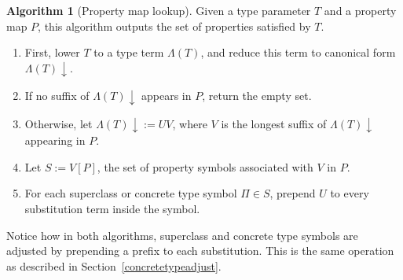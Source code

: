 \documentclass[headsepline,bibliography=totoc]{scrreport}
\theoremstyle{definition}
\theoremstyle{definition}
\theoremstyle{definition}
\newtheorem{algorithm}{Algorithm}[chapter]
\begin{document}
\begin{algorithm}[Property map lookup]\label{propmaplookupalgo} Given a type parameter $T$ and a property map $P$, this
algorithm outputs the set of properties satisfied by $T$.

\begin{enumerate}
\item First, lower $T$ to a type term $\Lambda(T)$, and reduce this term to canonical form $\Lambda(T){\downarrow}$.
\item If no suffix of $\Lambda(T){\downarrow}$ appears in $P$, return the empty set.
\item Otherwise, let $\Lambda(T){\downarrow}:=UV$, where $V$ is the longest suffix of $\Lambda(T){\downarrow}$ appearing in $P$.
\item Let $S:=V[P]$, the set of property symbols associated with $V$ in $P$.
\item For each superclass or concrete type symbol $\Pi\in S$, prepend $U$ to every substitution
term inside the symbol.
\end{enumerate}
\end{algorithm}
Notice how in both algorithms, superclass and concrete type symbols are adjusted by prepending a
prefix to each substitution. This is the same operation as described in
Section~\ref{concretetypeadjust}.
\end{document}
